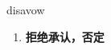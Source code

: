 
\begin{frame}
{\huge disavow}
\begin{center}
\begin{enumerate}\Large
  \item \textbf{拒绝承认，否定}
\end{enumerate}
\end{center}
\end{frame}
